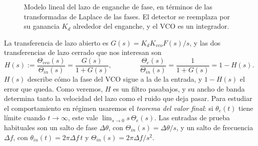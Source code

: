 \begin{figure}
    \begin{center}
    \end{center}
    \caption{Modelo lineal del lazo de enganche de fase, en términos de las transformadas de Laplace de las fases. El detector se reemplaza por su ganancia $K_d$ alrededor del enganche, y el VCO es un integrador.}\label{fig:pll lineal}
\end{figure}

La transferencia de lazo abierto es $G(s)=K_dK_{vco}F(s)/s$, y las dos transferencias de lazo cerrado que nos interesan son
\begin{equation}\label{eq:pll transferencias}
    H(s) := \frac{\Theta_{vco}(s)}{\Theta_{in}(s)} = \frac{G(s)}{1+G(s)}, \qquad\qquad \frac{\Theta_e(s)}{\Theta_{in}(s)} = \frac{1}{1+G(s)} = 1-H(s).
\end{equation}
$H(s)$ describe cómo la fase del VCO sigue a la de la entrada, y $1-H(s)$ el error que queda. Como veremos, $H$ es un filtro pasabajos, y su ancho de banda determina tanto la velocidad del lazo como el ruido que deja pasar. Para estudiar el comportamiento en régimen usaremos el \emph{teorema del valor final}: si $\theta_e(t)$ tiene límite cuando $t\to\infty$, este vale $\lim_{s\to 0} s\,\Theta_e(s)$. Las entradas de prueba habituales son un salto de fase $\Delta\theta$, con $\Theta_{in}(s)=\Delta\theta/s$, y un salto de frecuencia $\Delta f$, con $\theta_{in}(t)=2\pi\Delta f\,t$ y $\Theta_{in}(s)=2\pi\Delta f/s^2$.

